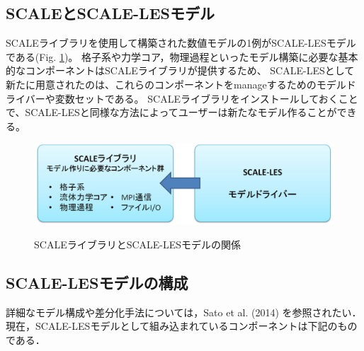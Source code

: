 \subsection{SCALEとSCALE-LESモデル}
SCALEライブラリを使用して構築された数値モデルの1例がSCALE-LESモデルである(Fig. \ref{fig:scale-les})。
格子系や力学コア，物理過程といったモデル構築に必要な基本的なコンポーネントはSCALEライブラリが提供するため、
SCALE-LESとして新たに用意されたのは、これらのコンポーネントをmanageするためのモデルドライバーや変数セットである。
SCALEライブラリをインストールしておくことで、SCALE-LESと同様な方法によってユーザーは新たなモデル作ることができる。

\begin{figure}[t]
\begin{center}
  \includegraphics[width=0.9\hsize]{./figure/scale_and_scale-les.eps}\\
  \caption{SCALEライブラリとSCALE-LESモデルの関係}
  \label{fig:scale-les}
\end{center}
\end{figure}


\subsection{SCALE-LESモデルの構成}
詳細なモデル構成や差分化手法については，Sato et al. (2014) を参照されたい．
現在，SCALE-LESモデルとして組み込まれているコンポーネントは下記のものである．

